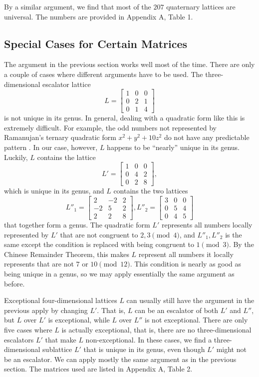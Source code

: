 \documentclass[letterpaper, 12pt]{article}
\begin{document}
By a similar argument, we find that most of the $207$ quaternary lattices are universal. The numbers are provided in Appendix A, Table 1.

\subsection{Special Cases for Certain Matrices}
The argument in the previous section works well most of the time.  There are only a couple of cases where different arguments have to be used. The three-dimensional escalator lattice
\[L = \begin{bmatrix} 1 & 0 & 0 \\ 0 & 2 & 1 \\ 0 & 1 & 4 \end{bmatrix}\]
is not unique in its genus.
In general, dealing with a quadratic form like this is extremely difficult. For example, the odd numbers not represented by Ramanujan's ternary quadratic form $x^2 + y^2 + 10z^2$ do not have any predictable pattern \cite{OnoSoundararajan1997}.
In our case, however, $L$ happens to be ``nearly'' unique in its genus. Luckily, $L$ contains the lattice
\[L' = \begin{bmatrix} 1 & 0 & 0 \\ 0 & 4 & 2 \\ 0 & 2 & 8 \end{bmatrix},\]
which is unique in its genus, and $L$ contains the two lattices
\[L''_1 = \begin{bmatrix} 2 & -2 & 2 \\ -2 & 5 & 2 \\ 2 & 2 & 8 \end{bmatrix}, L''_2 = \begin{bmatrix} 3 & 0 & 0 \\ 0 & 5 & 4 \\ 0 & 4 & 5 \end{bmatrix}\]
that together form a genus. The quadratic form $L'$ represents all numbers locally represented by $L'$ that are not congruent to $2, 3 \pmod 4$, and $L''_1, L''_2$ is the same except the condition is replaced with being congruent to $1 \pmod 3$. By the Chinese Remainder Theorem, this makes $L$ represent all numbers it locally represents that are not $7$ or $10 \pmod{12}$. This condition is nearly as good as being unique in a genus, so we may apply essentially the same argument as before.

Exceptional four-dimensional lattices $L$ can usually still have the argument in the previous apply by changing $L'$. That is, $L$ can be an escalator of both $L'$ and $L''$, but $L$ over $L'$ is exceptional, while $L$ over $L''$ is not exceptional. There are only five cases where $L$ is actually exceptional, that is, there are no three-dimensional escalators $L'$ that make $L$ non-exceptional. In these cases, we find a three-dimensional sublattice $L'$ that is unique in its genus, even though $L'$ might not be an escalator. We can apply mostly the same argument as in the previous section. The matrices used are listed in Appendix A, Table 2.
\end{document}
